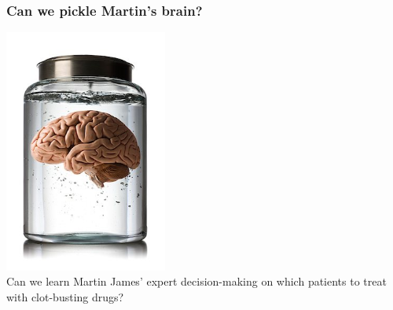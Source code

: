 \begin{frame}
\frametitle{Can we pickle Martin's brain?}

\begin{center}
\includegraphics[width=0.40\textwidth]{./images/brain_in_jar}
\\
\small{Can we learn Martin James' expert decision-making on which patients to treat with clot-busting drugs?}
\end{center}   

\end{frame}